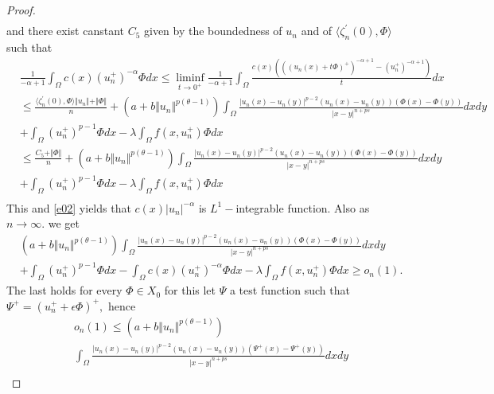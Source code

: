 \documentclass[10pt,twoside,reqno,centertags,draft]{amsart}
\begin{document}
\begin{proof}
\begin{equation*}
\begin{aligned}
\end{aligned}
\end{equation*}
and there exist canstant $ C_5$ given by the boundedness of $ u_n$ and of $ \langle\zeta^{\prime}_n(0),\Phi \rangle$ such that
{\tiny
\begin{equation*}
\begin{aligned}
&\frac{1}{-\alpha +1}\int_{\Omega}c(x)(u_n^+)^{-\alpha}\Phi dx \leq \liminf_{t \to 0^+}\frac{1}{-\alpha +1}\int_{\Omega}\frac{c(x)\left(((u_n(x) +t\Phi)^+)^{-\alpha +1} -(u_n^+)^{-\alpha +1}\right)}{t}dx\\
& \leq \frac{\langle\zeta^{\prime}_n(0), \Phi\rangle\Vert u_n\Vert +\Vert\Phi\Vert}{n} +\left( a +b\Vert u_n\Vert^{p(\theta -1)}\right)\int_{\Omega}\frac{\vert u_n(x) -u_n(y)\vert^{p -2}(u_n(x) -u_n(y))(\Phi(x) -\Phi(y))}{\vert x -y\vert^{n +ps}}dxdy\\
& +\int_{\Omega}(u_n^+)^{p-1}\Phi dx -\lambda \int_{\Omega}f(x, u_n^+)\Phi dx\\
& \leq \frac{C_5 +\Vert \Phi\Vert}{n} +\left( a +b\Vert u_n\Vert^{p(\theta -1)}\right)\int_{\Omega}\frac{\vert u_n(x) -u_n(y)\vert^{p -2}(u_n(x) -u_n(y))(\Phi(x) -\Phi(y))}{\vert x -y\vert^{n +ps}}dxdy\\
& +\int_{\Omega}(u_n^+)^{p-1}\Phi dx -\lambda \int_{\Omega}f(x, u_n^+)\Phi dx\\
\end{aligned}
\end{equation*}
}
This and \ref{e02} yields that $ c(x)\vert u_n\vert^{-\alpha}$ is $ L^{1}-$integrable function. Also as $ n \to \infty.$ we get
\begin{equation*}
\begin{aligned}
&\left( a +b\Vert u_n\Vert^{p(\theta -1)}\right)\int_{\Omega}\frac{\vert u_n(x) -u_n(y)\vert^{p -2}(u_n(x) -u_n(y))(\Phi(x) -\Phi(y))}{\vert x -y\vert^{n +ps}}dxdy \\
& +\int_{\Omega}(u_n^+)^{p-1}\Phi dx-\int_{\Omega}c(x)(u_n^+)^{-\alpha}\Phi dx -\lambda \int_{\Omega}f(x, u_n^+)\Phi dx \geq o_n(1).
\end{aligned}
\end{equation*}
The last holds for every $ \Phi \in X_0$ for this let $ \Psi$ a test function such that $ \Psi^+ =(u_n^+ +\epsilon\Phi)^{+}, $ hence
\begin{equation}\label{e016}
\begin{aligned}
&o_n(1) \leq \left( a +b\Vert u_n\Vert^{p(\theta -1)}\right)\\
&\int_{\Omega}\frac{\vert u_n(x) -u_n(y)\vert^{p -2}(u_n(x) -u_n(y))(\Psi^{+}(x) -\Psi^{+}(y))}{\vert x -y\vert^{n +ps}}dxdy \\

\end{aligned}
\end{equation}
\end{proof}
\end{document}
